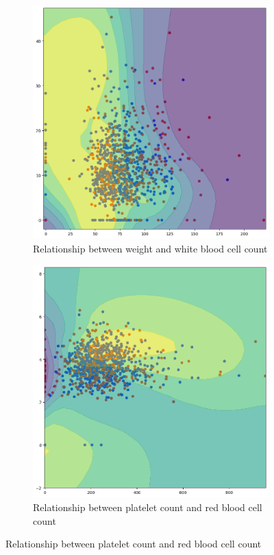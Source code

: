 \documentclass[../main.tex]{subfiles}
\begin{document}
\begin{figure}[H]
    \begin{subfigure}{0.45\textwidth}
        \centering
        \includegraphics[width=\linewidth]{Figure/weight-wbc.png}
        \caption{Relationship between weight and white blood cell count}
        \label{fig:tabpfn-weight-wbc}
    \end{subfigure}
    \hfill
    \begin{subfigure}{0.45\textwidth}
        \centering
        \includegraphics[width=\linewidth]{Figure/plt-rbc.png}
        \caption{Relationship between platelet count and red blood cell count}
        \label{fig:tabpfn-plt-rbc}
    \end{subfigure}


\end{figure}
\end{document}
